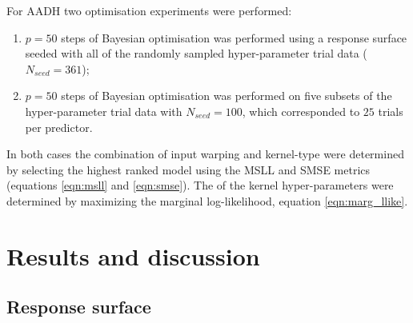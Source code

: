 For AADH two optimisation experiments were performed:
\begin{enumerate}
    \item $p=50$ steps of Bayesian optimisation was performed using a response surface seeded with all of the randomly sampled hyper-parameter trial data ($N_{seed}=361$);
    \item $p=50$ steps of Bayesian optimisation was performed on five subsets  of the hyper-parameter trial data with  $N_{seed}=100$, which corresponded to $25$ trials per predictor.
\end{enumerate} 

In both cases the combination of input warping and kernel-type  were determined by selecting the highest ranked model using the MSLL and SMSE metrics (equations \ref{eqn:msll} and \ref{eqn:smse}). The of the kernel hyper-parameters were determined by maximizing the marginal log-likelihood, equation \ref{eqn:marg_llike}. 

\section{Results and discussion}
\subsection{Response surface}\label{subsubsec:ala_rsm}

